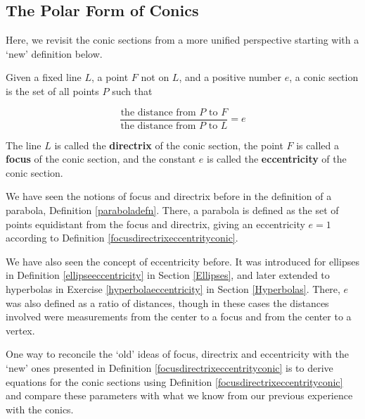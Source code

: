 \documentclass{ximera}
\begin{document}
\subsection{The Polar Form of Conics}
\label{polarformofconics}

Here, we revisit the conic sections from a more unified perspective starting with a  `new' definition below.

 

\begin{definition} \label{focusdirectrixeccentrityconic} Given a fixed line $L$,  a point $F$  not on $L$, and a positive number $e$, a conic section is the set of all points $P$ such that

\[ \frac{\text{the distance from $P$ to $F$}}{\text{the distance from $P$ to $L$}} = e\]

The line $L$ is called the \textbf{directrix} of the conic section, the point $F$ is called a \textbf{focus} of the conic section, and the constant $e$ is called the \textbf{eccentricity} of the conic section.

\end{definition}
  

We have seen the notions of focus and directrix before in the definition of a parabola, Definition \ref{paraboladefn}.   There, a parabola is defined as the set of points equidistant from the focus and directrix, giving an eccentricity $e = 1$ according to Definition \ref{focusdirectrixeccentrityconic}.  

 

We have also seen the concept of eccentricity before.  It was introduced for ellipses in Definition \ref{ellipseeccentricity} in Section \ref{Ellipses}, and later extended to hyperbolas in Exercise \ref{hyperbolaeccentricity} in Section \ref{Hyperbolas}.  There, $e$ was also defined as a ratio of distances, though in these cases the distances involved were measurements from the center to a focus and from the center to a vertex.  

 

One way to reconcile the `old' ideas of focus, directrix and eccentricity with the `new' ones presented in Definition \ref{focusdirectrixeccentrityconic} is to derive equations for the conic sections using Definition \ref{focusdirectrixeccentrityconic}  and compare these parameters with what we know from our previous experience with the conics. 
\end{document}
